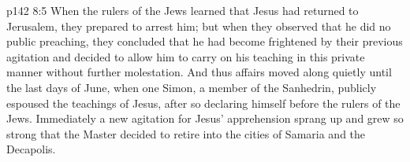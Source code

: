 \vs p142 8:5 When the rulers of the Jews learned that Jesus had returned to Jerusalem, they prepared to arrest him; but when they observed that he did no public preaching, they concluded that he had become frightened by their previous agitation and decided to allow him to carry on his teaching in this private manner without further molestation. And thus affairs moved along quietly until the last days of June, when one Simon, a member of the Sanhedrin, publicly espoused the teachings of Jesus, after so declaring himself before the rulers of the Jews. Immediately a new agitation for Jesus’ apprehension sprang up and grew so strong that the Master decided to retire into the cities of Samaria and the Decapolis.
